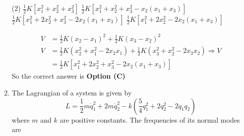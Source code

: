 \begin{enumerate}
\begin{tasks}(2)
\task[\textbf{A.}] $\frac{1}{2} K\left[x_{1}^{2}+x_{2}^{2}+x_{3}^{2}\right]$
\task[\textbf{B.}] $\frac{1}{2} K\left[x_{1}^{2}+x_{2}^{2}+x_{3}^{2}-x_{2}\left(x_{1}+x_{3}\right)\right]$
\task[\textbf{C.}] $\frac{1}{2} K\left[x_{1}^{2}+2 x_{2}^{2}+x_{3}^{2}-2 x_{2}\left(x_{1}+x_{3}\right)\right]$
\task[\textbf{D.}] $\frac{1}{2} K\left[x_{1}^{2}+2 x_{2}^{2}-2 x_{2}\left(x_{1}+x_{3}\right)\right]$
\end{tasks}
\begin{answer}
\begin{align*}
V&=\frac{1}{2} K\left(x_{2}-x_{1}\right)^{2}+\frac{1}{2} K\left(x_{3}-x_{2}\right)^{2}\\
V&=\frac{1}{2} K\left(x_{2}^{2}+x_{1}^{2}-2 x_{2} x_{1}\right)+\frac{1}{2} K\left(x_{3}^{2}+x_{2}^{2}-2 x_{3} x_{2}\right) \Rightarrow V\\&=\frac{1}{2} K\left[x_{1}^{2}+2 x_{2}^{2}+x_{3}^{2}-2 x_{2}\left(x_{1}+x_{3}\right)\right]
\end{align*}
So the correct answer is \textbf{Option (C)}
\end{answer}
\item The Lagrangian of a system is given by
$$
L=\frac{1}{2} m \dot{q}_{1}^{2}+2 m \dot{q}_{2}^{2}-k\left(\frac{5}{4} q_{1}^{2}+2 q_{2}^{2}-2 q_{1} q_{2}\right)
$$
where $m$ and $k$ are positive constants. The frequencies of its normal modes are


\end{enumerate}
